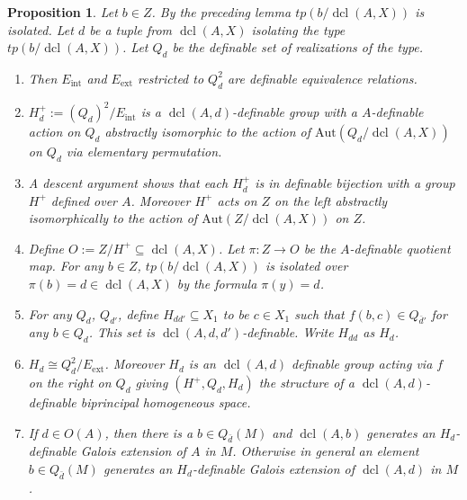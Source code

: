 \documentclass{amsart}
\newtheorem{proposition}[theorem]{Proposition}
\theoremstyle{definition}
\theoremstyle{remark}
\numberwithin{equation}{section}
\def \tp {tp}
\def \aut {\text{Aut}}
\def \dcl {\operatorname{dcl}}
\begin{document}
\begin{proposition}\label{prop: binding groupoid}
    Let $b \in Z$. By the preceding lemma $\tp(b/\dcl(A,X))$ is isolated. Let $d$ be a tuple from $\dcl(A,X)$ isolating the type $\tp(b/\dcl(A,X))$. Let $Q_{d}$ be the definable set of realizations of the type. 
 
    \begin{enumerate}
        \item Then $E_{\text{int}}$ and $E_{\text{ext}}$ restricted to $Q_{d}^2$ are definable equivalence relations. 
        \item $H_{d}^+ := (Q_{d})^2/E_{\text{int}}$ is a $\dcl(A,d)$-definable group with a $A$-definable action on $Q_{d}$ abstractly isomorphic to the action of $\aut(Q_{d}/\dcl(A,X))$ on $Q_{d}$ via elementary permutation.
        \item A descent argument shows that each $H^+_{d}$ is in definable bijection with a group $H^+$ defined over $A$. Moreover $H^+$ acts on $Z$ on the left abstractly isomorphically to the action of $\aut(Z/\dcl(A,X))$ on $Z$. 
        \item Define $O:=Z/H^+ \subseteq \dcl(A,X)$. Let $\pi:Z \to O$ be the $A$-definable quotient map. For any $b \in Z$, $\tp(b/\dcl(A,X))$ is isolated over $\pi(b) = d \in \dcl(A,X)$ by the formula $\pi(y) = d$.
        \item For any $Q_{d}$, $Q_{d'}$, define $H_{dd'} \subseteq X_1$ to be $c \in X_1$ such that $f(b,c) \in Q_{\bar{d}'}$ for any $b \in Q_{d}$. This set is $\dcl(A,d,d')$-definable. Write $H_{dd}$ as $H_{d}$. 
        \item $H_{d} \cong Q_{d}^2/E_{\text{ext}}$. Moreover $H_{d}$ is an $\dcl(A,d)$ definable group acting via $f$ on the right on $Q_{d}$ giving $(H^+,Q_{d},H_{d})$ the structure of a $\dcl(A,d)$-definable biprincipal homogeneous space.
        \item If $d \in O(A)$, then there is a $b \in Q_{\bar{d}}(M)$ and $\dcl(A,b)$ generates an $H_d$-definable Galois extension of $A$ in $M$. Otherwise in general an element $b \in Q_{\bar{d}}(M)$ generates an $H_d$-definable Galois extension of $\dcl(A,d)$ in $M$.
    \end{enumerate}
\end{proposition}
\end{document}
